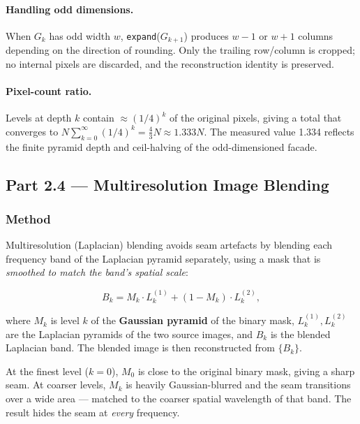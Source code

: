 \documentclass[12pt,a4paper]{article}
\begin{document}
\paragraph{Handling odd dimensions.}
When $G_k$ has odd width $w$, \texttt{expand}($G_{k+1}$) produces $w-1$ or
$w+1$ columns depending on the direction of rounding.  Only the trailing
row/column is cropped; no internal pixels are discarded, and the reconstruction
identity is preserved.

\paragraph{Pixel-count ratio.}
Levels at depth $k$ contain $\approx(1/4)^k$ of the original pixels,
giving a total that converges to
$N\sum_{k=0}^{\infty}(1/4)^k = \tfrac{4}{3}N \approx 1.333N$.
The measured value 1.334 reflects the finite pyramid depth and ceil-halving
of the odd-dimensioned facade.

\subsection{Part 2.4 \texorpdfstring{---}{-} Multiresolution Image Blending}
\label{sec:24}

\subsubsection{Method}

Multiresolution (Laplacian) blending \cite{BurtAdelson1983} avoids seam
artefacts by blending each frequency band of the Laplacian pyramid separately,
using a mask that is \emph{smoothed to match the band's spatial scale}:

\begin{equation}
  B_k = M_k \cdot L_k^{(1)} + (1 - M_k) \cdot L_k^{(2)},
  \label{eq:blend}
\end{equation}

where $M_k$ is level $k$ of the \textbf{Gaussian pyramid} of the binary mask,
$L_k^{(1)}, L_k^{(2)}$ are the Laplacian pyramids of the two source images,
and $B_k$ is the blended Laplacian band.  The blended image is then
reconstructed from $\{B_k\}$.

At the finest level ($k=0$), $M_0$ is close to the original binary mask,
giving a sharp seam.  At coarser levels, $M_k$ is heavily Gaussian-blurred
and the seam transitions over a wide area — matched to the coarser spatial
wavelength of that band.  The result hides the seam at \emph{every} frequency.
\end{document}
